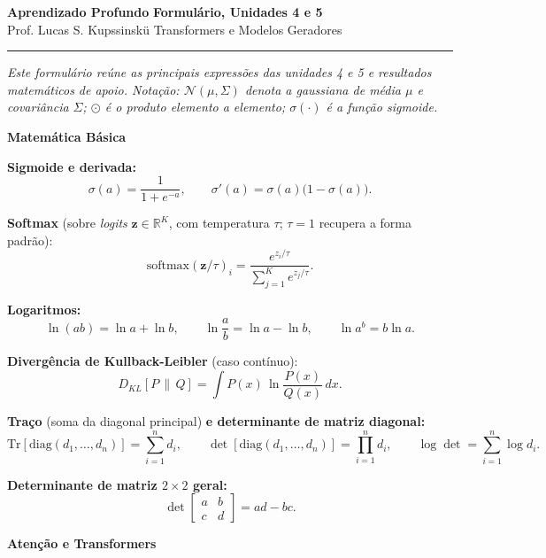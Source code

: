 \documentclass[11pt,a4paper]{article}
\newcommand{\Nc}{\mathcal{N}}
\newcommand{\bloco}[1]{%
  \par\vspace{0.3em}%
  {\bfseries\large #1}\par%
  \vspace{-0.4em}{\color{gray!60}\rule{\linewidth}{0.4pt}}\par%
}
\begin{document}
{\Large\bfseries Aprendizado Profundo} \hfill \textbf{Formulário, Unidades 4 e 5}\\
Prof. Lucas S. Kupssinskü \hfill Transformers e Modelos Geradores

\rule{\linewidth}{0.8pt}

\textit{Este formulário reúne as principais expressões das unidades 4 e 5 e resultados matemáticos de apoio. Notação: $\Nc(\mu,\Sigma)$ denota a gaussiana de média $\mu$ e covariância $\Sigma$; $\odot$ é o produto elemento a elemento; $\sigma(\cdot)$ é a função sigmoide.}

\bloco{Matemática Básica}

\textbf{Sigmoide e derivada:}
\[
  \sigma(a) = \frac{1}{1 + e^{-a}},
  \qquad
  \sigma'(a) = \sigma(a)\bigl(1 - \sigma(a)\bigr).
\]

\textbf{Softmax} (sobre \textit{logits} $\mathbf{z} \in \mathbb{R}^{K}$, com temperatura $\tau$; $\tau = 1$ recupera a forma padrão):
\[
  \mathrm{softmax}(\mathbf{z}/\tau)_i = \frac{e^{z_i/\tau}}{\sum_{j=1}^{K} e^{z_j/\tau}}.
\]

\textbf{Logaritmos:}
\[
  \ln(ab) = \ln a + \ln b, \qquad
  \ln\frac{a}{b} = \ln a - \ln b, \qquad
  \ln a^{b} = b \ln a.
\]

\textbf{Divergência de Kullback-Leibler} (caso contínuo):
\[
  D_{KL}[P\,\|\,Q] = \int P(x)\,\ln\frac{P(x)}{Q(x)}\,dx.
\]

\textbf{Traço} (soma da diagonal principal) \textbf{e determinante de matriz diagonal:}
\[
  \mathrm{Tr}\!\left[\mathrm{diag}(d_1, \dots, d_n)\right] = \sum_{i=1}^{n} d_i,
  \qquad
  \det\!\left[\mathrm{diag}(d_1, \dots, d_n)\right] = \prod_{i=1}^{n} d_i,
  \qquad
  \log\det = \sum_{i=1}^{n} \log d_i.
\]

\textbf{Determinante de matriz $2 \times 2$ geral:}
\[
  \det\!\begin{bmatrix} a & b \\ c & d \end{bmatrix} = ad - bc.
\]

\bloco{Atenção e Transformers}
\end{document}

